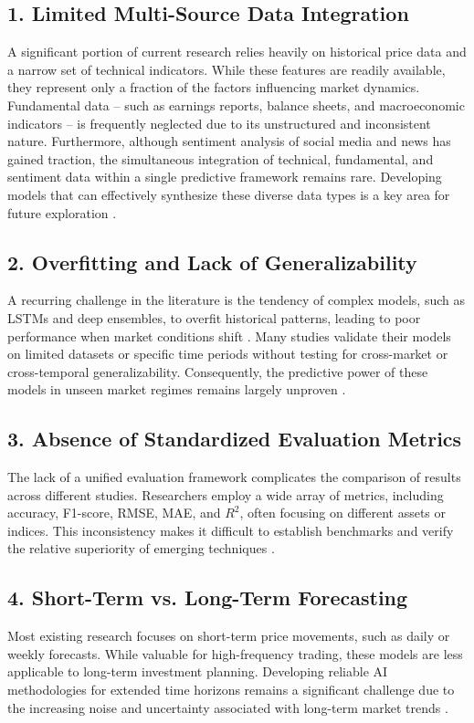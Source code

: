 \documentclass[11pt,a4paper]{article}
\begin{document}
\subsection*{1. Limited Multi-Source Data Integration}
A significant portion of current research relies heavily on historical price data and a narrow set of
technical indicators. While these features are readily available, they represent only a fraction of the
factors influencing market dynamics. Fundamental data -- such as earnings reports, balance sheets,
and macroeconomic indicators -- is frequently neglected due to its unstructured and inconsistent
nature. Furthermore, although sentiment analysis of social media and news has gained traction, the
simultaneous integration of technical, fundamental, and sentiment data within a single predictive
framework remains rare. Developing models that can effectively synthesize these diverse data types is
a key area for future exploration \cite{sonkavde2023,lin2024}.

\subsection*{2. Overfitting and Lack of Generalizability}
A recurring challenge in the literature is the tendency of complex models, such as LSTMs and deep
ensembles, to overfit historical patterns, leading to poor performance when market conditions shift
\cite{sheth2023,bansal2022}. Many studies validate their models on limited datasets or specific time
periods without testing for cross-market or cross-temporal generalizability. Consequently, the
predictive power of these models in unseen market regimes remains largely unproven
\cite{subasi2021}.

\subsection*{3. Absence of Standardized Evaluation Metrics}
The lack of a unified evaluation framework complicates the comparison of results across different
studies. Researchers employ a wide array of metrics, including accuracy, F1-score, RMSE, MAE, and
$R^2$, often focusing on different assets or indices. This inconsistency makes it difficult to establish
benchmarks and verify the relative superiority of emerging techniques \cite{strader2020,lin2024}.

\subsection*{4. Short-Term vs. Long-Term Forecasting}
Most existing research focuses on short-term price movements, such as daily or weekly forecasts.
While valuable for high-frequency trading, these models are less applicable to long-term investment
planning. Developing reliable AI methodologies for extended time horizons remains a significant
challenge due to the increasing noise and uncertainty associated with long-term market trends
\cite{sonkavde2023,bansal2022}.
\end{document}
